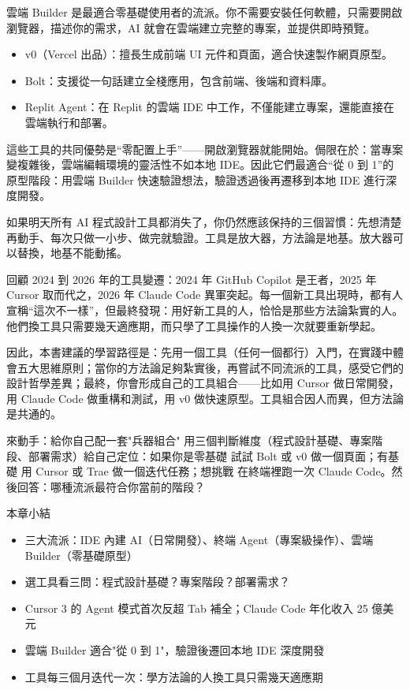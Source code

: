 雲端 Builder 是最適合零基礎使用者的流派。你不需要安裝任何軟體，只需要開啟瀏覽器，描述你的需求，AI 就會在雲端建立完整的專案，並提供即時預覽。

\begin{itemize}
  \item v0（Vercel 出品）：擅長生成前端 UI 元件和頁面，適合快速製作網頁原型。
  \item Bolt：支援從一句話建立全棧應用，包含前端、後端和資料庫。
  \item Replit Agent：在 Replit 的雲端 IDE 中工作，不僅能建立專案，還能直接在雲端執行和部署。
\end{itemize}

這些工具的共同優勢是“零配置上手”——開啟瀏覽器就能開始。侷限在於：當專案變複雜後，雲端編輯環境的靈活性不如本地 IDE。因此它們最適合“從 0 到 1”的原型階段：用雲端 Builder 快速驗證想法，驗證透過後再遷移到本地 IDE 進行深度開發。


如果明天所有 AI 程式設計工具都消失了，你仍然應該保持的三個習慣：先想清楚再動手、每次只做一小步、做完就驗證。工具是放大器，方法論是地基。放大器可以替換，地基不能動搖。

回顧 2024 到 2026 年的工具變遷：2024 年 GitHub Copilot 是王者，2025 年 Cursor 取而代之，2026 年 Claude Code 異軍突起。每一個新工具出現時，都有人宣稱“這次不一樣”，但最終發現：用好新工具的人，恰恰是那些方法論紮實的人。他們換工具只需要幾天適應期，而只學了工具操作的人換一次就要重新學起。

因此，本書建議的學習路徑是：先用一個工具（任何一個都行）入門，在實踐中體會五大思維原則；當你的方法論足夠紮實後，再嘗試不同流派的工具，感受它們的設計哲學差異；最終，你會形成自己的工具組合——比如用 Cursor 做日常開發，用 Claude Code 做重構和測試，用 v0 做快速原型。工具組合因人而異，但方法論是共通的。

\begin{tcbpractice}{來動手：給你自己配一套"兵器組合"}
用三個判斷維度（程式設計基礎、專案階段、部署需求）給自己定位：如果你是零基礎 試試 Bolt 或 v0 做一個頁面；有基礎 用 Cursor 或 Trae 做一個迭代任務；想挑戰 在終端裡跑一次 Claude Code。然後回答：哪種流派最符合你當前的階段？

\end{tcbpractice}

\begin{tcbsummary}{本章小結}
\begin{itemize}
  \item 三大流派：IDE 內建 AI（日常開發）、終端 Agent（專案級操作）、雲端 Builder（零基礎原型）
  \item 選工具看三問：程式設計基礎？專案階段？部署需求？
  \item Cursor 3 的 Agent 模式首次反超 Tab 補全；Claude Code 年化收入 25 億美元
  \item 雲端 Builder 適合"從 0 到 1"，驗證後遷回本地 IDE 深度開發
  \item 工具每三個月迭代一次：學方法論的人換工具只需幾天適應期
\end{itemize}

\end{tcbsummary}
